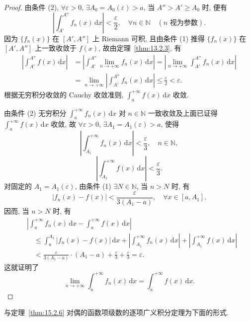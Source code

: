 \begin{proof}
由条件 (2), $\forall\varepsilon>0$, $\exists A_{0}=A_{0}(\varepsilon)>a$, 当 $A''>A'\geqslant A_{0}$ 时, 便有
\[
  \left|\int_{A'}^{A''}f_{n}(x)\,\mathrm{d}x\right|<\frac{\varepsilon}{2},\quad\forall n\in\mathbb{N}\quad(n\text{ 视为参数}).
\]
因为 $\{f_{n}(x)\}$ 在 $[A',A'']$ 上 Riemann 可积, 且由条件 (1) 推得 $\{f_{n}(x)\}$ 在 $[A',A'']$ 上一致收敛于 $f(x)$, 故由定理~\ref{thm:13.2.3}, 有
\[
  \begin{aligned}
    \left|\int_{A'}^{A''}f(x)\,\mathrm{d}x\right|&=\left|\int_{A'}^{A''}\lim_{n\to+\infty}f_{n}(x)\,\mathrm{d}x\right|=\left|\lim_{n\to+\infty}\int_{A'}^{A''}f_{n}(x)\,\mathrm{d}x\right|\\
    &=\lim_{n\to+\infty}\left|\int_{A'}^{A''}f_{n}(x)\,\mathrm{d}x\right|\leqslant\frac{\varepsilon}{2}<\varepsilon.
  \end{aligned}
\]
根据无穷积分收敛的 Cauchy 收敛准则, $\displaystyle\int_{a}^{+\infty}f(x)\,\mathrm{d}x$ 收敛.

由条件 (2) 无穷积分 $\displaystyle\int_{a}^{+\infty}f_{n}(x)\,\mathrm{d}x$ 对 $n\in\mathbb{N}$ 一致收敛及上面已证得 $\displaystyle\int_{a}^{+\infty}f(x)\,\mathrm{d}x$ 收敛, 故 $\forall\varepsilon>0$, $\exists A_{1}=A_{1}(\varepsilon)>a$, 使得
\[
  \left|\int_{A_{1}}^{+\infty}f_{n}(x)\,\mathrm{d}x\right|<\frac{\varepsilon}{3},\quad n\in\mathbb{N},
\]
\[
  \left|\int_{A_{1}}^{+\infty}f(x)\,\mathrm{d}x\right|<\frac{\varepsilon}{3}.
\]
对固定的 $A_{1}=A_{1}(\varepsilon)$, 由条件 (1) $\exists N\in\mathbb{N}$, 当 $n>N$ 时, 有
\[
  |f_{n}(x)-f(x)|<\frac{\varepsilon}{3(A_{1}-a)},\quad\forall x\in[a,A_{1}].
\]
因而, 当 $n>N$ 时, 有
\[
  \begin{aligned}
    &\left|\int_{a}^{+\infty}f_{n}(x)\,\mathrm{d}x-\int_{a}^{+\infty}f(x)\,\mathrm{d}x\right|\\
    &\quad\leqslant\int_{a}^{A_{1}}|f_{n}(x)-f(x)|\,\mathrm{d}x+\left|\int_{A_{1}}^{+\infty}f_{n}(x)\,\mathrm{d}x\right|+\left|\int_{A_{1}}^{+\infty}f(x)\,\mathrm{d}x\right|\\
    &\quad<\frac{\varepsilon}{3(A_{1}-a)}\cdot(A_{1}-a)+\frac{\varepsilon}{3}+\frac{\varepsilon}{3}=\varepsilon.
  \end{aligned}
\]
这就证明了
\[
  \lim_{n\to+\infty}\int_{a}^{+\infty}f_{n}(x)\,\mathrm{d}x=\int_{a}^{+\infty}f(x)\,\mathrm{d}x.
\]
\end{proof}

与定理~\ref{thm:15.2.6} 对偶的函数项级数的逐项广义积分定理为下面的形式.

